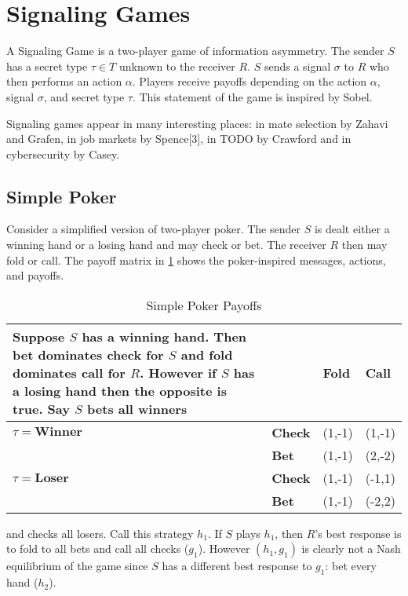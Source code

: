 \documentclass{article}
\begin{document}
\section{Signaling Games}

A Signaling Game is a two-player game of information asymmetry. The sender $S$ has a secret type $\tau \in T$ unknown to the receiver $R$. $S$ sends a signal $\sigma$ to $R$ who then performs an action $\alpha$. Players receive payoffs depending on the action $\alpha$, signal $\sigma$, and secret type $\tau$. This statement of the game is inspired by Sobel\cite{sobel1}.

Signaling games appear in many interesting places: in mate selection by Zahavi\cite{zahavi1} and Grafen\cite{grafen1}, in job markets by Spence[3], in TODO by Crawford\cite{crawford1} and in cybersecurity by Casey\cite{casey1}\cite{casey2}\cite{casey3}.


\subsection{Simple Poker}

Consider a simplified version of two-player poker. The sender $S$ is dealt either a winning hand or a losing hand and may check or bet. The receiver $R$ then may fold or call. The payoff matrix in \ref{simplepokerpayoffs} shows the poker-inspired messages, actions, and payoffs.

\begin{table}[H]
	\centering
	\caption{Simple Poker Payoffs}
	\label{simplepokerpayoffs}
	\begin{tabular}{ll|l|l|}
		\cline{3-4}

Suppose $S$ has a winning hand. Then bet dominates check for $S$ and fold dominates call for $R$. However if $S$ has a losing hand then the opposite is true. Say $S$ bets all winners 
		&       & \textbf{Fold} & \textbf{Call} \\ \hline
		\multicolumn{1}{|l|}{$\tau=\textbf{Winner}$} & \textbf{Check} & (1,-1)  & (1,-1)  \\ \cline{2-4}
		\multicolumn{1}{|l|}{}        & \textbf{Bet}   & (1,-1)  & (2,-2)  \\ \hline
		\multicolumn{1}{|l|}{$\tau=\textbf{Loser}$}  & \textbf{Check} & (1,-1)  & (-1,1)  \\ \cline{2-4}
		\multicolumn{1}{|l|}{}        & \textbf{Bet}   & (1,-1)  & (-2,2) \\ \hline
	\end{tabular}
\end{table}and checks all losers. Call this strategy $h_1$. If $S$ plays $h_1$, then $R$'s best response is to fold to all bets and call all checks ($g_1$). However $(h_1, g_1)$ is clearly not a Nash equilibrium of the game since $S$ has a different best response to $g_1$: bet every hand ($h_2$).
\end{document}
